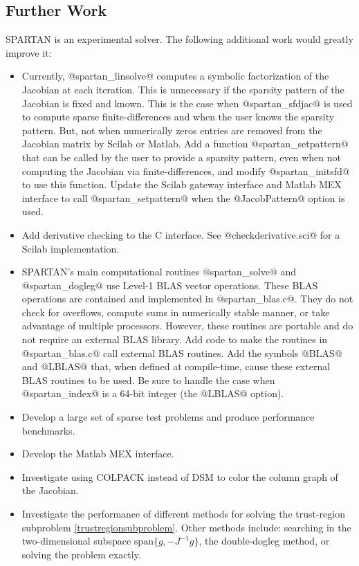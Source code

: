 \documentclass[10pt]{article}
\newcommand{\solverf}{\sffamily}
\newcommand{\linspan}{\mathrm{span}}
\newcommand{\matlab}{{\sc Matlab}}
\newcommand{\scilab}{{\sc Scilab}}
\newcommand{\spartan}{{\solverf SPARTAN}}
\newcommand{\dsm}{{\solverf DSM}}
\newcommand{\colpack}{{\solverf COLPACK}}
\begin{document}
\subsection*{Further Work}

\spartan{} is an experimental solver. The following additional work would greatly improve it:
\begin{itemize}
\item Currently, @spartan_linsolve@ computes a symbolic factorization
  of the Jacobian at each iteration. This is unnecessary if the sparsity pattern
  of the Jacobian is fixed and known. This is the case when @spartan_sfdjac@ is used to
  compute sparse finite-differences and when the user knows the
  sparsity pattern. But, not when numerically zeros entries are removed
  from the Jacobian matrix by \scilab{} or \matlab{}.  Add a function
  @spartan_setpattern@ that can be called by the user to provide a
  sparsity pattern, even when not computing the Jacobian via
  finite-differences, and modify @spartan_initsfd@ to use this
  function. Update the \scilab{} gateway interface and \matlab{} MEX
  interface to call @spartan_setpattern@ when the @JacobPattern@ option 
  is used.
\item Add derivative checking to the C interface. See @checkderivative.sci@ 
  for a \scilab{} implementation.
\item \spartan's main computational routines @spartan_solve@ and
  @spartan_dogleg@ use Level-1 BLAS vector operations.  These BLAS
  operations are contained and implemented in @spartan_blas.c@. They
  do not check for overflows, compute sums in numerically stable
  manner, or take advantage of multiple processors. However, these
  routines are portable and do not require an external BLAS
  library. Add code to make the routines in @spartan_blas.c@ call
  external BLAS routines.  Add the symbols @BLAS@ and @LBLAS@ that, when
  defined at compile-time, cause these external BLAS routines to be
  used. Be sure to handle the case when @spartan_index@ is a 64-bit 
  integer (the @LBLAS@ option). 
\item Develop a large set of sparse test problems and produce performance benchmarks.
\item Develop the \matlab{} MEX interface. 
\item Investigate using \colpack{} \cite{colpack:website} instead of \dsm{} to color the column graph of the Jacobian. 
\item Investigate the performance of different methods for solving the
  trust-region subproblem \eqref{trustregionsubproblem}. Other methods
  include: searching in the two-dimensional subspace $\linspan
  \{g,-J^{-1} g\}$, the double-dogleg method, or solving the problem
  exactly.
\end{itemize}



\end{document}
